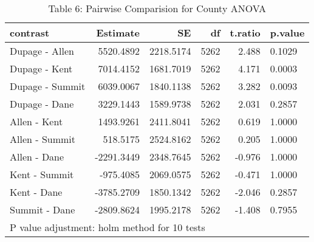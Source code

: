 \documentclass{article}
\begin{document}
\begin{table}[ht]
	\centering
	\caption*{Table 6: Pairwise Comparision for County ANOVA}
	\begin{tabular}{lrrrrl}
		\hline
		contrast & Estimate & SE & df & t.ratio & p.value \\ 
		\hline
		Dupage - Allen & 5520.4892 & 2218.5174 & 5262 & 2.488 & 0.1029 \\ 
		Dupage - Kent & 7014.4152 & 1681.7019 & 5262 & 4.171 & 0.0003 \\ 
		Dupage - Summit & 6039.0067 & 1840.1138 & 5262 & 3.282 & 0.0093 \\ 
		Dupage - Dane & 3229.1443 & 1589.9738 & 5262 & 2.031 & 0.2857 \\ 
		Allen - Kent & 1493.9261 & 2411.8041 & 5262 & 0.619 & 1.0000 \\ 
		Allen - Summit & 518.5175 & 2524.8162 & 5262 & 0.205 & 1.0000 \\ 
		Allen - Dane & -2291.3449 & 2348.7645 & 5262 & -0.976 & 1.0000 \\ 
		Kent - Summit & -975.4085 & 2069.0575 & 5262 & -0.471 & 1.0000 \\ 
		Kent - Dane & -3785.2709 & 1850.1342 & 5262 & -2.046 & 0.2857 \\ 
		Summit - Dane & -2809.8624 & 1995.2178 & 5262 & -1.408 & 0.7955 \\ 
		\hline
		\multicolumn{6}{l}{{\footnotesize P value adjustment: holm method for 10 tests}}\\
	\end{tabular}
\end{table}
\end{document}
